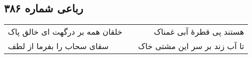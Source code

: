 \begin{center}
\section*{رباعی شماره ۳۸۶}
\label{sec:sh386}
\begin{longtable}{l p{0.5cm} r}
خلقان همه بر درگهت ای خالق پاک
&&
هستند پی قطرهٔ آبی غمناک
\\
سقای سحاب را بفرما از لطف
&&
تا آب زند بر سر این مشتی خاک
\\
\end{longtable}
\end{center}
